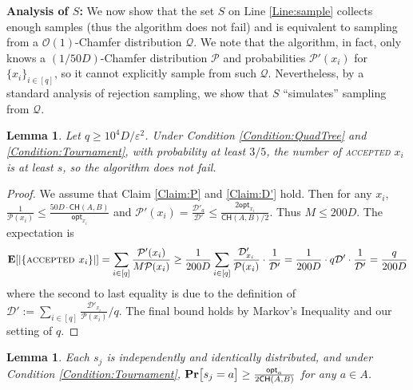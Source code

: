 \documentclass[11pt]{article}
\newcommand{\eps}{\varepsilon}
\theoremstyle{plain}
\newtheorem{lem}[theorem]{Lemma}
\newcommand{\calP}{\mathcal{P}} \newcommand{\calD}{\mathcal{D}}
\newcommand{\calQ}{\mathcal{Q}}
\newcommand{\OO}{\mathcal{O}}
\newcommand{\pr}[1]{\text{\bf Pr}\normalfont\bigl[ #1 \bigr]}
\newcommand{\e}[1]{\text{\bf E}\normalfont\lbrack #1 \rbrack}
\newcommand{\opt}{\mathsf{opt}}
\begin{document}
{\bf Analysis of $S$:} We now show that the set $S$ on Line \ref{Line:sample} collects enough samples (thus the algorithm does not fail) and is equivalent to sampling from a $\OO(1)$-Chamfer distribution $\calQ$. We note that the algorithm, in fact, only knows a $(1/50{{D}})$-Chamfer distribution $\calP$ and probabilities $\calP'(x_i)$ for $\{x_i\}_{i \in [q]}$, so it cannot explicitly sample from such $\calQ$. Nevertheless, by a standard analysis of rejection sampling, we show that $S$ ``simulates'' sampling from $\calQ$.

\begin{lem}\label{Lemma:size}
    Let $q \geq 10^4{{D}}/\eps^2$. Under Condition \ref{Condition:QuadTree} and \ref{Condition:Tournament}, with probability at least $3/5$, the number of \textsc{accepted} $x_i$ is at least $s$, so the algorithm does not fail.
\end{lem}

\begin{proof}
    We assume that Claim \ref{Claim:P} and \ref{Claim:D'} hold. Then for any $x_i$, $\frac{1}{\calP(x_i)} \leq \frac{50{{D}} \cdot \mathsf{CH}(A, B)}{\opt_{x_i}}$ and $\calP'(x_i) =\frac{\calD'_a}{\calD'} \leq \frac{2\opt_{x_i}}{\mathsf{CH}(A,B)/2}$. Thus $M \leq 200{{D}}$.
    The expectation is 
    \[ 
        \e{|\{\textsc{accepted } x_i\}|} = \sum_{i \in [q]} \frac{\calP'(x_i)}{M \calP({x_i})} 
        \geq \frac{1}{200{{D}}}  \sum_{i \in [q]} \frac{\calD'_{x_i}}{\calP(x_i)}\cdot\frac{1}{\calD'}
        = \frac{1}{200{{D}}} \cdot  q \calD'\cdot\frac{1}{\calD'}
        = \frac{q}{200 {{D}}}
    \]
    where the second to last equality is due to the definition of $\calD' := \sum_{i \in [q]}\frac{\calD'_{x_i}}{\calP(x_i)}/ q$. The final bound holds by Markov's Inequality and our setting of $q$.
\end{proof}



\begin{lem}\label{Lemma:equivalent}
    Each $s_j$ is independently and identically distributed, and under Condition \ref{Condition:Tournament}, $\pr{s_j = a} \geq \frac{\opt_a}{2\mathsf{CH}(A, B)}$ for any $a \in A$.
\end{lem}
\end{document}
